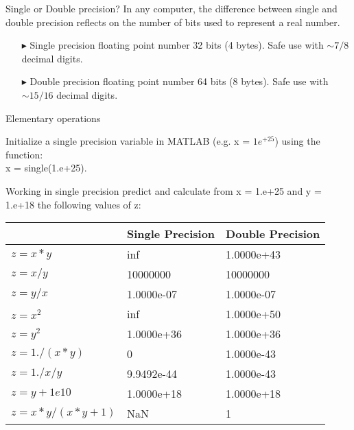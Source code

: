 \documentclass[xcolor={dvipsnames,rgb}, aspectratio=169]{beamer}
\begin{document}
\begin{frame}{Single or Double precision?}
    In any computer, the difference between single and double precision reflects on the
    number of bits used to represent a real number.
    \begin{itemize}
        \item[$\blacktriangleright$] Single precision floating point number 32 bits (4
           bytes). Safe use with $\sim 7/8$ decimal digits.
        \item[$\blacktriangleright$] Double precision floating point number 64 bits (8
           bytes). Safe use with $\sim 15/16$ decimal digits.
    \end{itemize}
\end{frame}

\begin{frame}{Elementary operations}
\vspace{-.5cm}
   \small{Initialize a single precision variable in MATLAB (e.g. x = $1e^{+25}$) using
   the function:\\
   x = \alert{single}(1.e+25).

   Working in single precision predict and calculate from x = 1.e+25  and y = 1.e+18 the
   following values of z:}

   \begin{table}
   \centering
   \begin{tabular}{l|l|l} 
   \hline
   \multicolumn{1}{l}{} & \multicolumn{1}{l}{\textbf{Single Precision}} & \textbf{Double Precision}  \\ 
   \hline
      $z = x * y$ & inf & 1.0000e+43 \\
      \hline
      $z = x / y$ & 10000000 & 10000000 \\
      \hline
      $z = y / x$ & 1.0000e-07 & 1.0000e-07 \\
      \hline
      $z = x^2$ & inf & 1.0000e+50 \\
      \hline
      $z = y^2$ & 1.0000e+36 & 1.0000e+36 \\
      \hline
      $z = 1./(x*y)$ & 0 & 1.0000e-43 \\
      \hline
      $z = 1./x/y$ & 9.9492e-44 & 1.0000e-43 \\
      \hline
      $z = y + 1e10$ & 1.0000e+18 & 1.0000e+18 \\
      \hline
      $z = x * y / (x * y + 1)$ & NaN & 1 \\
   \hline
   \end{tabular}
   \end{table}
\end{frame}
\end{document}
